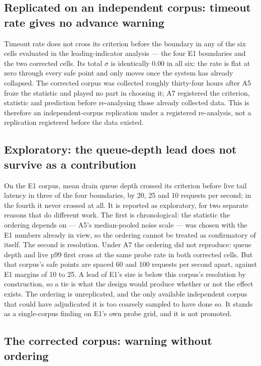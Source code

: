 \documentclass{ieeeaccess}
\begin{document}
\subsection{Replicated on an independent corpus: timeout rate gives no advance warning}

Timeout rate does not cross its criterion before the boundary in any of the six cells evaluated in the leading-indicator analysis --- the four E1 boundaries and the two corrected cells. Its total $\sigma$ is identically 0.00 in all six: the rate is flat at zero through every safe point and only moves once the system has already collapsed. The corrected corpus was collected roughly thirty-four hours after A5 froze the statistic and played no part in choosing it; A7 registered the criterion, statistic and prediction before re-analysing those already collected data. This is therefore an independent-corpus replication under a registered re-analysis, not a replication registered before the data existed.

\subsection{Exploratory: the queue-depth lead does not survive as a contribution}

On the E1 corpus, mean drain queue depth crossed its criterion before live tail latency in three of the four boundaries, by 20, 25 and 10 requests per second; in the fourth it never crossed at all. It is reported as exploratory, for two separate reasons that do different work. The first is chronological: the statistic the ordering depends on --- A5's median-pooled noise scale --- was chosen with the E1 numbers already in view, so the ordering cannot be treated as confirmatory of itself. The second is resolution. Under A7 the ordering did not reproduce: queue depth and live p99 first cross at the same probe rate in both corrected cells. But that corpus's safe points are spaced 60 and 100 requests per second apart, against E1 margins of 10 to 25. A lead of E1's size is below this corpus's resolution by construction, so a tie is what the design would produce whether or not the effect exists. The ordering is unreplicated, and the only available independent corpus that could have adjudicated it is too coarsely sampled to have done so. It stands as a single-corpus finding on E1's own probe grid, and it is not promoted.

\subsection{The corrected corpus: warning without ordering}
\end{document}
